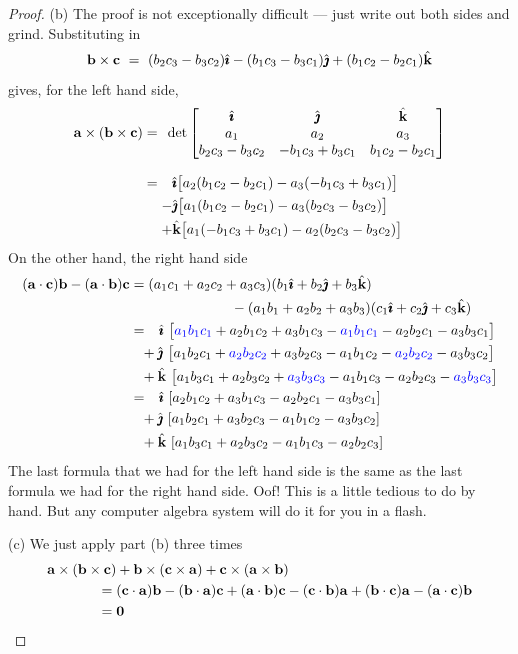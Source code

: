 \begin{proof}
\noindent (b)
The proof is not exceptionally difficult --- just write out both sides and grind.
Substituting in
\begin{equation*}
\mathbf{b}\times\mathbf{c}
\ =\ (b_2c_3-b_3c_2)\hat{\pmb{\imath}}-(b_1c_3-b_3c_1)\hat{\pmb{\jmath}} + (b_1c_2-b_2c_1)\hat{\mathbf{k}}
\end{equation*}
gives, for the left hand side,
\begin{align*}
\mathbf{a}\times(\mathbf{b}\times\mathbf{c})
=\phantom{-}&\!\!\!\det\left[\begin{matrix}\hat{\pmb{\imath}}&\hat{\pmb{\jmath}} &\hat{\mathbf{k}}\\
                     a_1&a_2&a_3\\
                     b_2c_3-b_3c_2&-b_1c_3+b_3c_1&b_1c_2-b_2c_1
                     \end{matrix}\right]\\[0.1in]
=\phantom{-}&\hat{\pmb{\imath}}\big[a_2(b_1c_2-b_2c_1)-a_3(-b_1c_3+b_3c_1)\big]\\
-&\hat{\pmb{\jmath}}\big[a_1(b_1c_2-b_2c_1)-a_3(b_2c_3-b_3c_2)\big]\\
+&\hat{\mathbf{k}}\big[a_1(-b_1c_3+b_3c_1)-a_2(b_2c_3-b_3c_2)\big]
\end{align*}
On the other hand, the right hand side
\begin{align*}
(\mathbf{a}\cdot\mathbf{c})\mathbf{b}-(\mathbf{a}\cdot\mathbf{b})\mathbf{c}
&=(a_1c_1+a_2c_2+a_3c_3)(b_1\hat{\pmb{\imath}}+b_2\hat{\pmb{\jmath}}+b_3\hat{\mathbf{k}}) \\
     &\hskip1in -(a_1b_1+a_2b_2+a_3b_3)(c_1\hat{\pmb{\imath}}+c_2\hat{\pmb{\jmath}}+c_3\hat{\mathbf{k}})
\\
&=\phantom{-}
\hat{\pmb{\imath}}\ \big[\textcolor{blue}{a_1b_1c_1}
         +a_2b_1c_2+a_3b_1c_3-
         \textcolor{blue}{a_1b_1c_1}
         -a_2b_2c_1-a_3b_3c_1\big]
\\
&\phantom{=}+\hat{\pmb{\jmath}}\ \big[a_1b_2c_1
      +\textcolor{blue}{a_2b_2c_2}
      +a_3b_2c_3-a_1b_1c_2
      -\textcolor{blue}{a_2b_2c_2}
      -a_3b_3c_2\big]
\\
&\phantom{=}+\hat{\mathbf{k}}\ \big[a_1b_3c_1+a_2b_3c_2
          +\textcolor{blue}{a_3b_3c_3}
          -a_1b_1c_3-a_2b_2c_3
          -\textcolor{blue}{a_3b_3c_3}\big]
\\
&=\phantom{-}
\hat{\pmb{\imath}}\ [a_2b_1c_2+a_3b_1c_3-a_2b_2c_1-a_3b_3c_1]
\\
&\phantom{=}+\hat{\pmb{\jmath}}\ [a_1b_2c_1+a_3b_2c_3-a_1b_1c_2-a_3b_3c_2]
\\
&\phantom{=}+\hat{\mathbf{k}}\ [a_1b_3c_1+a_2b_3c_2-a_1b_1c_3-a_2b_2c_3]
\end{align*}
The last formula that we had for the left hand side is the same as the last formula we had for the right hand side. Oof! This is a little tedious
to do by hand. But any computer algebra system will do it for you in a 
flash.


\noindent (c)
We just apply part (b) three times
\begin{align*}
          &\mathbf{a}\times(\mathbf{b}\times\mathbf{c}) + 
            \mathbf{b}\times(\mathbf{c}\times\mathbf{a}) +
            \mathbf{c}\times(\mathbf{a}\times\mathbf{b})  \\
&\hskip0.5in= (\mathbf{c}\cdot\mathbf{a})\mathbf{b}-(\mathbf{b}\cdot\mathbf{a})\mathbf{c}
            + (\mathbf{a}\cdot\mathbf{b})\mathbf{c}-(\mathbf{c}\cdot\mathbf{b})\mathbf{a}
            + (\mathbf{b}\cdot\mathbf{c})\mathbf{a}-(\mathbf{a}\cdot\mathbf{c})\mathbf{b} \\
&\hskip0.5in=\mathbf{0}            
\end{align*}
\end{proof}



